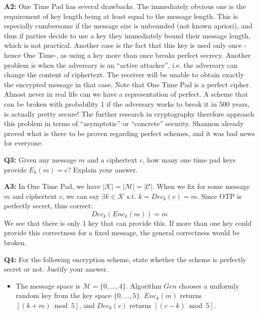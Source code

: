 \documentclass[12pt,reqno]{amsart}
\newcommand{\st}[0]{\text{ s.t. }}
\begin{document}
\textbf{A2:} One Time Pad has several drawbacks. The immediately obvious one is the requirement of key length being at least equal to the message length. This is especially cumbersome if the message size is unbounded (not known apriori), and thus if parties decide to use a key they immediately bound their message length, which is not practical. Another case is the fact that this key is used only once -hence One Time-, as using a key more than once breaks perfect secrecy. Another problem is when the adversary is an ``active attacker'', i.e. the adversary can change the content of ciphertext. The receiver will be unable to obtain exactly the encrypted message in that case. Note that One Time Pad is a perfect cipher. Almost never in real life can we have a representation of perfect. A scheme that can be broken with probability 1 if the adversary works to break it in 500 years, is actually pretty secure! The further research in cryptography therefore approach this problem in terms of ``asymptotic'' or ``concrete'' security. Shannon already proved what is there to be proven regarding perfect schemes, and it was bad news for everyone.



\vspace{20px}
\textbf{Q3:} Given any message $m$ and a ciphertext $c$, how many one time pad keys provide  $E_k(m)=c$?  Explain your answer.

\textbf{A3:} In One Time Pad, we have $|\mathcal{K}|=|\mathcal{M}|=|\mathcal{C}|$. When we fix for some message $m$ and ciphertext $c$, we can say $\exists k \in \mathcal{K} \st k = Dec_k(c)=m$. Since OTP is perfectly secret, thus correct:
$$
Dec_k(Enc_k(m))=m
$$
We see that there is only 1 key that can provide this. If more than one key could provide this correctness for a fixed message, the general correctness would be broken.

\vspace{20px}
\textbf{Q4:} For the following encryption scheme, state whether the scheme is perfectly secret or not. Justify your answer.
\begin{itemize}
\item   The message space is $\mathcal{M} = \{0, \ldots, 4\}$. Algorithm $Gen$ chooses a uniformly random key from the key space $\{0, \ldots, 5\}$. $Enc_k(m)$ returns $[(   k + m   )   \bmod 5]$,   and   $Dec_k (c)$   returns   $[(c-k) \bmod 5]$.
\end{itemize}
\end{document}
